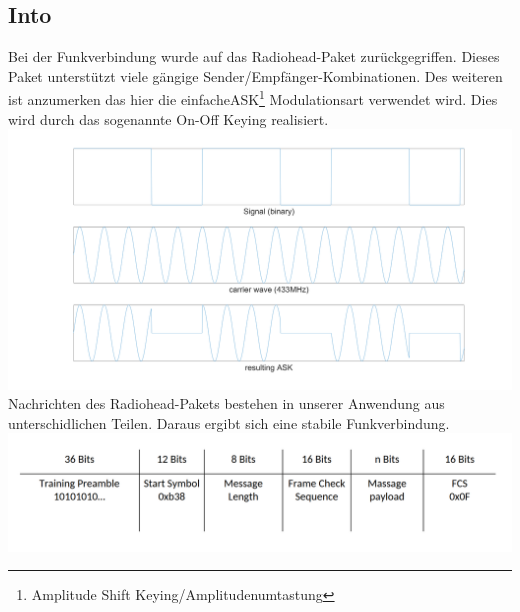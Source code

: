 \subsection{Into}
Bei der Funkverbindung wurde auf das Radiohead-Paket\cite{rh} zurückgegriffen. Dieses Paket unterstützt viele gängige Sender/Empfänger-Kombinationen. Des weiteren ist anzumerken das hier die \grqq einfache\grqq  ASK\footnote{Amplitude Shift Keying/Amplitudenumtastung} Modulationsart verwendet wird. Dies wird durch das sogenannte On-Off Keying realisiert. \newline\includegraphics[width=\textwidth]{Hauptteil/sw/intro/ask.png}
Nachrichten des Radiohead-Pakets bestehen in unserer Anwendung aus unterschidlichen Teilen. Daraus ergibt sich eine stabile Funkverbindung.
\newline\includegraphics[width=\textwidth]{Hauptteil/sw/intro/packege.png}